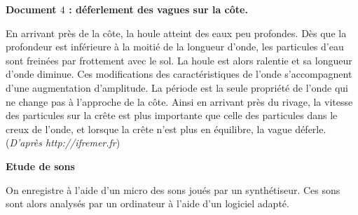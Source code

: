 
\newpage

\textbf{Document $4$ : déferlement des vagues sur la côte.}

\vspace{0.3cm}

En arrivant près de la côte, la houle atteint des eaux peu profondes. Dès que la profondeur est inférieure à la moitié de la longueur d'onde, les particules d'eau sont freinées par frottement avec le sol. La houle est alors ralentie et sa longueur d'onde diminue. Ces modifications des caractéristiques de l'onde s'accompagnent d'une augmentation d'amplitude. La période est la seule propriété de l'onde qui ne change pas à l'approche de la côte.
Ainsi en arrivant près du rivage, la vitesse des particules sur la crête est plus importante que celle des particules
dans le creux de l'onde, et lorsque la crête n'est plus en équilibre, la vague déferle. (\textit{D'après http://ifremer.fr})

\vspace{0.3cm}

\exo \textbf{Etude de sons}

\vspace{0.3cm}

On enregistre à l'aide d'un micro des sons joués par un synthétiseur. Ces sons
sont alors analysés par un ordinateur à l'aide d'un logiciel adapté.

\vspace{0.3cm}

